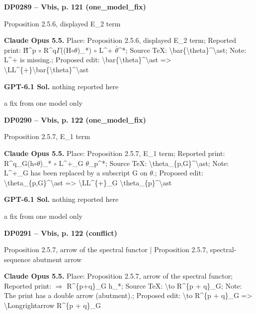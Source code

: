 \par\noindent\hypertarget{DP0289}{}\textbf{DP0289 -- Vbis, p. 121 (one\_model\_fix)}\par
Proposition 2.5.6, displayed E\_2 term\par
\textbf{Claude Opus 5.5.} Place: Proposition 2.5.6, displayed E\_2 term; Reported print: Ȟ\textasciicircum{}p \ensuremath{\circ} R\textasciicircum{}q\ensuremath{\Gamma}((H\ensuremath{\circ}\ensuremath{\theta})\_*) \ensuremath{\circ} L\textasciicircum{}+ \ensuremath{\bar{\theta}}\textasciicircum{}*; Source TeX: \textbackslash{}bar\{\textbackslash{}theta\}\textasciicircum{}\textbackslash{}ast; Note: L\textasciicircum{}+ is missing.; Proposed edit: \textbackslash{}bar\{\textbackslash{}theta\}\textasciicircum{}\textbackslash{}ast =\allowbreak > \textbackslash{}LL\textasciicircum{}\{+\}\textbackslash{}bar\{\textbackslash{}theta\}\textasciicircum{}\textbackslash{}ast\par
\textbf{GPT-6.1 Sol.} nothing reported here\par
a fix from one model only\par
\par\noindent\hypertarget{DP0290}{}\textbf{DP0290 -- Vbis, p. 122 (one\_model\_fix)}\par
Proposition 2.5.7, E\_1 term\par
\textbf{Claude Opus 5.5.} Place: Proposition 2.5.7, E\_1 term; Reported print: R\textasciicircum{}q\_G(h\ensuremath{\circ}\ensuremath{\theta})\_* \ensuremath{\circ} L\textasciicircum{}+\_G \ensuremath{\theta}\_p\textasciicircum{}*; Source TeX: \textbackslash{}theta\_\{p,G\}\textasciicircum{}\textbackslash{}ast; Note: L\textasciicircum{}+\_G has been replaced by a subscript G on \ensuremath{\theta}.; Proposed edit: \textbackslash{}theta\_\{p,G\}\textasciicircum{}\textbackslash{}ast =\allowbreak > \textbackslash{}LL\textasciicircum{}\{+\}\_G \textbackslash{}theta\_\{p\}\textasciicircum{}\textbackslash{}ast\par
\textbf{GPT-6.1 Sol.} nothing reported here\par
a fix from one model only\par
\par\noindent\hypertarget{DP0291}{}\textbf{DP0291 -- Vbis, p. 122 (conflict)}\par
Proposition 2.5.7, arrow of the spectral functor | Proposition 2.5.7, spectral-sequence abutment arrow\par
\textbf{Claude Opus 5.5.} Place: Proposition 2.5.7, arrow of the spectral functor; Reported print: \ensuremath{\Longrightarrow} R\textasciicircum{}\{p+q\}\_G h\_*; Source TeX: \textbackslash{}to R\textasciicircum{}\{p + q\}\_G; Note: The print has a double arrow (abutment).; Proposed edit: \textbackslash{}to R\textasciicircum{}\{p + q\}\_G =\allowbreak > \textbackslash{}Longrightarrow R\textasciicircum{}\{p + q\}\_G\par
